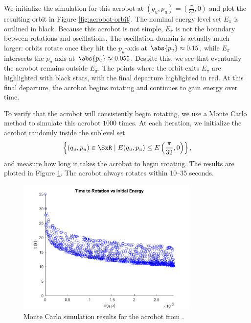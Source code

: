 We initialize the simulation for this acrobot at 
\((q_u,p_u) = \left(\frac{\pi}{32},0 \right)\) and plot the resulting orbit in 
Figure \ref{fig:acrobot-orbit}.
The nominal energy level set \(E_\pi\) is outlined in black. 
Because this acrobot is not simple, \(E_\pi\) is not the boundary between
rotations and oscillations.
The oscillation domain is actually much larger: orbits rotate once they hit the
\(p_u\)-axis at \(\abs{p_u} \approx 0.15\), while \(E_\pi\) intersects the
\(p_u\)-axis at \(\abs{p_u} \approx 0.055\).
Despite this, we see that eventually the acrobot remains outside \(E_\pi\).
The points where the orbit exits \(E_\pi\) are highlighted with black stars,
with the final departure highlighted in red.
At this final departure, the acrobot begins rotating and continues to gain
energy over time.

To verify that the acrobot will consistently begin rotating, we use a Monte
Carlo method \cite{montecarlo} to simulate this
acrobot \(1000\) times.
At each iteration, we initialize the acrobot randomly inside the sublevel set
\[
    \left\{(q_u,p_u) \in \SxR \mid
    E(q_u,p_u) \leq E\left(\frac{\pi}{32},0\right)\right\}
    ,
\] 
and measure how long it takes the acrobot to begin rotating.
The results are plotted in Figure \ref{fig:acrobot-mc}.
The acrobot always rotates within 10--35 seconds.

\begin{figure}
    \centering
    \includegraphics[width=0.8\textwidth]{images/acrobot_mc.png}
    \caption{Monte Carlo simulation results for the acrobot from
    \cite{xingbo_thesis}.}
    \label{fig:acrobot-mc}
\end{figure}

